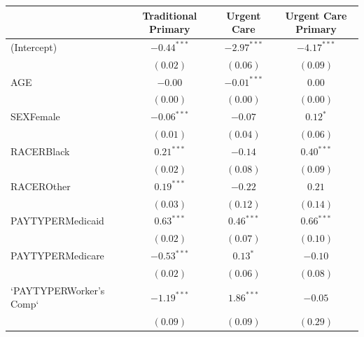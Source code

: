 \documentclass[12pt,twoside]{reedthesis}
\begin{document}
  \begin{table}
  \begin{center}
  \begin{footnotesize}
  \begin{tabular}{l c c c }
  \hline
   & Traditional Primary & Urgent Care & Urgent Care Primary \\
  \hline
  (Intercept)              & $\mathbf{-0.44}^{***}$ & $\mathbf{-2.97}^{***}$ & $\mathbf{-4.17}^{***}$ \\
                           & $(0.02)$               & $(0.06)$               & $(0.09)$               \\
  AGE                      & $-0.00$                & $\mathbf{-0.01}^{***}$ & $0.00$                 \\
                           & $(0.00)$               & $(0.00)$               & $(0.00)$               \\
  SEXFemale                & $\mathbf{-0.06}^{***}$ & $-0.07$                & $0.12^{*}$             \\
                           & $(0.01)$               & $(0.04)$               & $(0.06)$               \\
  RACERBlack               & $\mathbf{0.21}^{***}$  & $-0.14$                & $\mathbf{0.40}^{***}$  \\
                           & $(0.02)$               & $(0.08)$               & $(0.09)$               \\
  RACEROther               & $\mathbf{0.19}^{***}$  & $-0.22$                & $0.21$                 \\
                           & $(0.03)$               & $(0.12)$               & $(0.14)$               \\
  PAYTYPERMedicaid         & $\mathbf{0.63}^{***}$  & $\mathbf{0.46}^{***}$  & $\mathbf{0.66}^{***}$  \\
                           & $(0.02)$               & $(0.07)$               & $(0.10)$               \\
  PAYTYPERMedicare         & $\mathbf{-0.53}^{***}$ & $0.13^{*}$             & $-0.10$                \\
                           & $(0.02)$               & $(0.06)$               & $(0.08)$               \\
  `PAYTYPERWorker's Comp`  & $\mathbf{-1.19}^{***}$ & $\mathbf{1.86}^{***}$  & $-0.05$                \\
                           & $(0.09)$               & $(0.09)$               & $(0.29)$               \\

\end{tabular}
\end{footnotesize}
\end{center}
\end{table}
\end{document}
